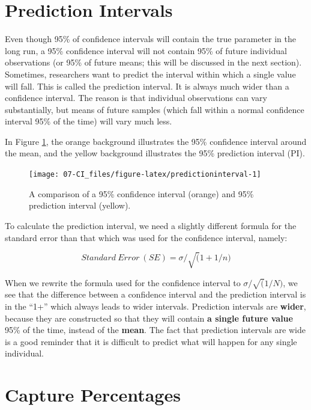 \documentclass[
  oneside]{krantz}
\begin{document}
\hypertarget{prediction-intervals}{%
\section{Prediction Intervals}\label{prediction-intervals}}

Even though 95\% of confidence intervals will contain the true parameter in the long run, a 95\% confidence interval will not contain 95\% of future individual observations (or 95\% of future means; this will be discussed in the next section). Sometimes, researchers want to predict the interval within which a single value will fall. This is called the prediction interval. It is always much wider than a confidence interval. The reason is that individual observations can vary substantially, but means of future samples (which fall within a normal confidence interval 95\% of the time) will vary much less.

In Figure \ref{fig:predictioninterval}, the orange background illustrates the 95\% confidence interval around the mean, and the yellow background illustrates the 95\% prediction interval (PI).



\begin{figure}

{\centering \texttt{[image: 07-CI\_files/figure-latex/predictioninterval-1]} 

}

\caption{A comparison of a 95\% confidence interval (orange) and 95\% prediction interval (yellow).}\label{fig:predictioninterval}
\end{figure}

To calculate the prediction interval, we need a slightly different formula for the standard error than that which was used for the confidence interval, namely:

\[
Standard \ Error \ (SE) = \sigma/\sqrt(1+1/n)
\]

When we rewrite the formula used for the confidence interval to \(\sigma/\sqrt(1/N)\), we see that the difference between a confidence interval and the prediction interval is in the ``1+'' which always leads to wider intervals. Prediction intervals are \textbf{wider}, because they are constructed so that they will contain \textbf{a single future value} 95\% of the time, instead of the \textbf{mean}. The fact that prediction intervals are wide is a good reminder that it is difficult to predict what will happen for any single individual.

\hypertarget{capture-percentages}{%
\section{Capture Percentages}\label{capture-percentages}}
\end{document}
